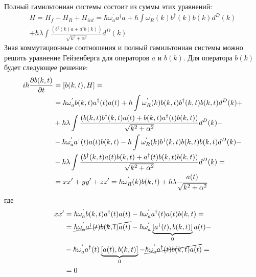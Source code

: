 Полный гамильтониан системы состоит из суммы этих уравнений:
\begin{multline}
    H = H_f + H_R + H_{int} = \hbar \omega^{'}_a a^{\dagger} a + \hbar \int \omega^{'}_{R}(k) b^{\dagger}(k) b(k) d^{D}(k) \\
    + \hbar \lambda \int \frac{(b^{\dagger}(k) a + a^{\dagger} b(k))}{\sqrt{k^{2} + \alpha^{2}}} d^{D}(k)
\end{multline}
Зная коммутационные соотношения и полный гамильтониан системы можно решить уравнение Гейзенберга
для операторов $a$ и $b(k)$. Для оператора $b(k)$ будет следующее решение:
\begin{equation}\notag
    \begin{split}
        i \hbar \frac{\partial b(k,t)}{\partial t} & = [b(k,t), H] = \\
        & = \hbar \omega^{'}_a b(k,t) a^{\dagger}(t) a(t) + \hbar \int \omega^{'}_{R}(k) b(k,t) b^{\dagger}(k,t) b(k,t) d^{D}(k) + \\
        & + \hbar \lambda \int \frac{(b(k,t) b^{\dagger}(k,t) a(t) + b(k,t) a^{\dagger}(t) b(k,t))}{\sqrt{k^{2} + \alpha^{2}}} d^{D}(k) - \\
        & - \hbar \omega^{'}_a a^{\dagger}(t) a(t) b(k,t) - \hbar \int \omega^{'}_{R}(k) b^{\dagger}(k,t) b(k,t) b(k,t) d^{D}(k) - \\
        & - \hbar \lambda \int \frac{(b^{\dagger}(k,t) a(t) b(k,t) + a^{\dagger}(t) b(k,t) b(k,t))}{\sqrt{k^{2} + \alpha^{2}}} d^{D}(k) = \\
        & = xx' + yy' + zz' = \hbar \omega^{'}_{R}(k) b(k,t) + \hbar \lambda \frac{a(t)}{\sqrt{k^{2} + \alpha^{2}}}
    \end{split}
\end{equation}
где
\begin{equation}\notag
    \begin{split}
        xx' & = \hbar \omega^{'}_a b(k,t) a^{\dagger}(t) a(t) - \hbar \omega^{'}_a a^{\dagger}(t) a(t) b(k,t) = \\
        & = \cancel{\hbar \omega^{'}_a a^{\dagger}(t) b(k,t) a(t)} - \hbar \omega^{'}_a \underbrace{[a^{\dagger}(t), b(k,t)]}_{0} a(t) - \\
        & - \hbar \omega^{'}_a a^{\dagger}(t) \underbrace{[a(t), b(k,t)]}_{0} - \cancel{\hbar \omega^{'}_a a^{\dagger}(t) b(k,t) a(t)} = \\
        & = 0
    \end{split}
\end{equation}
